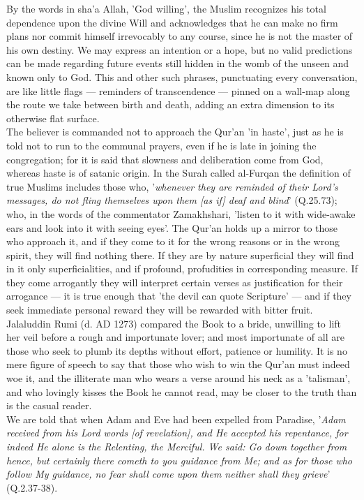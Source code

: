 \documentclass[11pt, b5paper, twoside]{book}
\begin{document}
By the words in sha'a Allah, 'God willing', the Muslim recognizes his total dependence upon the 
divine Will and acknowledges that he can make no firm plans nor commit himself irrevocably to any 
course, since he is not the master of his own destiny. We may express an intention or a hope, but no 
valid predictions can be made regarding future events still hidden in the womb of the unseen and 
known only to God. This and other such phrases, punctuating every conversation, are like little flags 
--- reminders of transcendence --- pinned on a wall-map along the route we take between birth and death, adding an extra dimension to its otherwise flat surface. \\

The believer is commanded not to approach the Qur'an 'in haste', just as he is told not to run to the 
communal prayers, even if he is late in joining the congregation; for it is said that slowness and 
deliberation come from God, whereas haste is of satanic origin. In the Surah called al-Furqan the 
definition of true Muslims includes those who, '\emph{whenever they are reminded of their Lord's messages, do not fling themselves upon them [as if] deaf and blind}' (Q.25.73); who, in the words of the 
commentator Zamakhshari, 'listen to it with wide-awake ears and look into it with seeing eyes'. The 
Qur'an holds up a mirror to those who approach it, and if they come to it for the wrong reasons or in 
the wrong spirit, they will find nothing there. If they are by nature superficial they will find in 
it only superficialities, and if profound, profudities in corresponding measure. If they come 
arrogantly they will interpret certain verses as justification for their arrogance --- it is true 
enough that 'the devil can quote Scripture' --- and if they seek immediate personal reward they will be 
rewarded with bitter fruit. \\

Jalaluddin Rumi (d. AD 1273) compared the Book to a bride, unwilling to lift her veil before a rough 
and importunate lover; and most importunate of all are those who seek to plumb its depths without 
effort, patience or humility. It is no mere figure of speech to say that those who wish to win the 
Qur'an must indeed woe it, and the illiterate man who wears a verse around his neck as a 'talisman', 
and who lovingly kisses the Book he cannot read, may be closer to the truth than is the casual 
reader. \\

We are told that when Adam and Eve had been expelled from Paradise, '\emph{Adam received from his Lord words [of revelation], and He accepted his repentance, for indeed He alone is the Relenting, the 
Merciful. We said: Go down together from hence, but certainly there cometh to you guidance from Me; 
and as for those who follow My guidance, no fear shall come upon them neither shall they 
grieve}' (Q.2.37-38). \\
\end{document}
